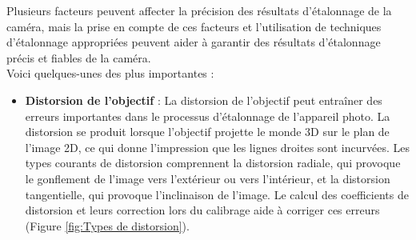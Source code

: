   
  Plusieurs facteurs peuvent affecter la précision des résultats d’étalonnage de la caméra, mais la prise en compte de ces facteurs et l’utilisation de techniques d’étalonnage appropriées peuvent aider à garantir des résultats d’étalonnage précis et fiables de la caméra. \\
  
  Voici quelques-unes des plus importantes : 
  
  \begin{itemize}
  	\item \textbf{Distorsion de l’objectif } :  La distorsion de l’objectif peut entraîner des erreurs importantes dans le processus d’étalonnage de l’appareil photo. La distorsion se produit lorsque l’objectif projette le monde 3D sur le plan de l’image 2D, ce qui donne l’impression que les lignes droites sont incurvées. Les types courants de distorsion comprennent la distorsion radiale, qui provoque le gonflement de l’image vers l’extérieur ou vers l’intérieur, et la distorsion tangentielle, qui provoque l’inclinaison de l’image. Le calcul des coefficients de distorsion et leurs correction lors du calibrage aide à corriger ces erreurs  (Figure \ref{fig:Types de distorsion}). 
  	

\end{itemize}
